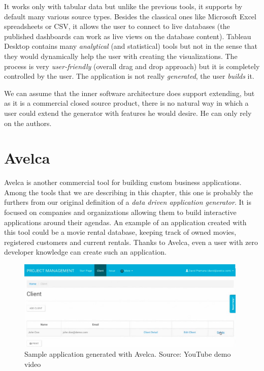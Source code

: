 It works only with tabular data but unlike the previous tools, it supports by default many various source types. Besides the classical ones like Microsoft Excel spreadsheets or CSV, it allows the user to connect to live databases (the published dashboards can work as live views on the database content). Tableau Desktop contains many \emph{analytical} (and statistical) tools but not in the sense that they would dynamically help the user with creating the visualizations. The process is very \emph{user-friendly} (overall drag and drop approach) but it is completely controlled by the user. The application is not really \emph{generated}, the user \emph{builds} it.

We can assume that the inner software architecture does support extending, but as it is a commercial closed source product, there is no natural way in which a user could extend the generator with features he would desire. He can only rely on the authors.

\section{Avelca}

Avelca \cite{avelca} is another commercial tool for building custom business applications. Among the tools that we are describing in this chapter, this one is probably the furthers from our original definition of a \emph{data driven application generator}. It is focused on companies and organizations allowing them to build interactive applications around their agendas. An example of an application created with this tool could be a movie rental database, keeping track of owned movies, registered customers and current rentals. Thanks to Avelca, even a user with zero developer knowledge can create such an application.

\begin{figure}
	\centering
	\includegraphics[width=110mm]{img/02_avelca.png}
	\caption{Sample application generated with Avelca. Source: YouTube demo video \cite{avelca_youtube}}
	\label{fig:avelca-example}
\end{figure}

